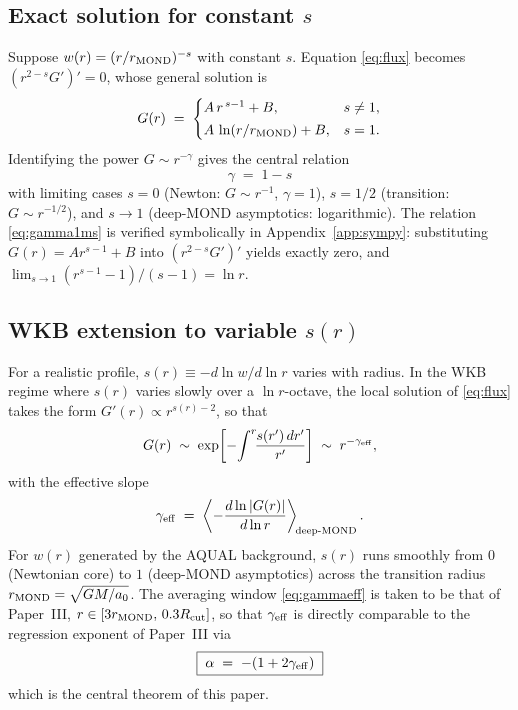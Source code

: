 \documentclass[aps,prd,twocolumn,superscriptaddress,nofootinbib]{revtex4-2}
\begin{document}
\subsection{Exact solution for constant $s$}

Suppose $w(r) = (r/r_{\rm MOND})^{-s}$ with constant $s$. Equation
\eqref{eq:flux} becomes $(r^{2-s} G')' = 0$, whose general solution
is
\begin{equation}
G(r) \;=\;
\begin{cases}
A\,r^{\,s-1} + B, & s\neq 1,\\[2pt]
A\,\ln(r/r_{\rm MOND}) + B, & s = 1.
\end{cases}
\label{eq:Gpow}
\end{equation}
Identifying the power $G\sim r^{-\gamma}$ gives the central
relation
\begin{equation}
\boxed{\;\gamma \;=\; 1 - s\;}
\label{eq:gamma1ms}
\end{equation}
with limiting cases $s=0$ (Newton: $G\sim r^{-1}$, $\gamma = 1$),
$s = 1/2$ (transition: $G\sim r^{-1/2}$), and $s\to 1$ (deep-MOND
asymptotics: logarithmic). The relation \eqref{eq:gamma1ms} is
verified symbolically in Appendix~\ref{app:sympy}: substituting
$G(r) = A r^{s-1}+B$ into $(r^{2-s}G')'$ yields exactly zero, and
$\lim_{s\to 1}(r^{s-1}-1)/(s-1) = \ln r$.

\subsection{WKB extension to variable $s(r)$}

For a realistic profile, $s(r) \equiv -d\ln w/d\ln r$ varies with
radius. In the WKB regime where $s(r)$ varies slowly over a
$\ln r$-octave, the local solution of \eqref{eq:flux} takes the form
$G'(r)\propto r^{s(r)-2}$, so that
\begin{equation}
G(r) \;\sim\; \exp\!\left[-\!\int^r\!\!\frac{s(r')\,dr'}{r'}\right]
\;\sim\; r^{-\gamma_{\rm eff}},
\label{eq:WKB}
\end{equation}
with the effective slope
\begin{equation}
\gamma_{\rm eff} \;=\; \left\langle -\frac{d\ln|G(r)|}{d\ln r}
\right\rangle_{\!\rm deep\text{-}MOND}.
\label{eq:gammaeff}
\end{equation}
For $w(r)$ generated by the AQUAL background, $s(r)$ runs smoothly
from $0$ (Newtonian core) to $1$ (deep-MOND asymptotics) across the
transition radius $r_{\rm MOND}=\sqrt{GM/a_0}$. The averaging
window \eqref{eq:gammaeff} is taken to be that of Paper~III,
$r\in[3 r_{\rm MOND},\,0.3 R_{\rm cut}]$, so that $\gamma_{\rm eff}$
is directly comparable to the regression exponent of Paper~III via
\begin{equation}
\boxed{\;\alpha \;=\; -(1 + 2\gamma_{\rm eff})\;}
\label{eq:theorem}
\end{equation}
which is the central theorem of this paper.
\end{document}
